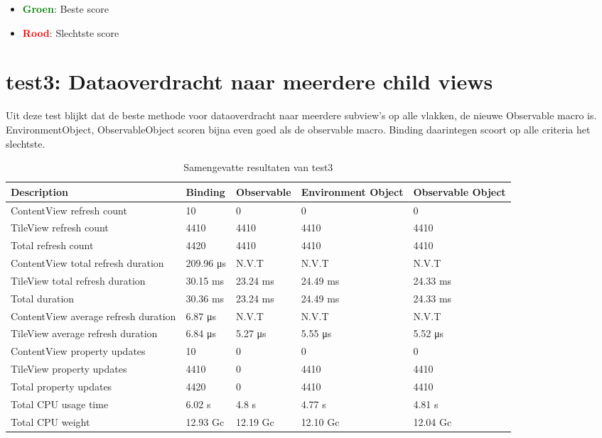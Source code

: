 \begin{itemize}
    \item \textcolor{green}{\textbf{Groen}}: Beste score
    \item \textcolor{red}{\textbf{Rood}}: Slechtste score
\end{itemize}
\section{test3: Dataoverdracht naar meerdere child views}
Uit deze test blijkt dat de beste methode voor dataoverdracht naar meerdere subview's op alle vlakken, de nieuwe Observable macro is. EnvironmentObject, ObservableObject scoren bijna even goed als de observable macro. Binding daarintegen scoort op alle criteria het slechtste.
\begin{table}[H]
    \centering
    \begin{tabularx}{\textwidth}{|>{\raggedright\arraybackslash}m{5cm}|X|X|X|X|}
        \hline
        \textbf{Description} & \textbf{Binding} & \textbf{Observable} & \textbf{Environment Object} & \textbf{Observable Object} \\
        \hline
         ContentView refresh count & 10 & 0 & 0 & 0 \\
        \hline
         TileView refresh count & 4410 & 4410 & 4410 & 4410 \\
        \hline
        Total refresh count & \cellcolor{red!50} 4420 & \cellcolor{green!50}4410 & \cellcolor{green!50}4410 & \cellcolor{green!50}4410 \\
        \hline
         ContentView total refresh duration & 209.96 μs & N.V.T & N.V.T & N.V.T \\
        \hline
        TileView total refresh duration & 30.15 ms & 23.24 ms & 24.49 ms & 24.33 ms \\
        \hline
        Total duration &  \cellcolor{red!50}30.36 ms & \cellcolor{green!50}23.24 ms & \cellcolor{green!50}24.49 ms & \cellcolor{green!50}24.33 ms \\
        \hline
        ContentView average refresh duration & 6.87 μs & N.V.T & N.V.T & N.V.T \\
        \hline
        TileView average refresh duration & 6.84 μs & 5.27 μs & 5.55 μs & 5.52 μs \\
        \hline
         ContentView property updates & 10 & 0 & 0 & 0 \\
        \hline
        TileView property updates & 4410 & 0 & 4410 & 4410 \\
        \hline
        Total property updates & \cellcolor{red!50} 4420 & \cellcolor{green!50}0 & 4410 & 4410 \\
        \hline
        Total CPU usage time & \cellcolor{red!50} 6.02 s & \cellcolor{green!50}4.8 s & \cellcolor{green!50}4.77 s & \cellcolor{green!50}4.81 s \\
        \hline
        Total CPU weight & \cellcolor{red!50} 12.93 Gc & \cellcolor{green!50}12.19 Gc & \cellcolor{green!50}12.10 Gc & \cellcolor{green!50}12.04 Gc \\
        \hline
    \end{tabularx}
    \caption{Samengevatte resultaten van test3}
    \label{table:summary3}
\end{table}